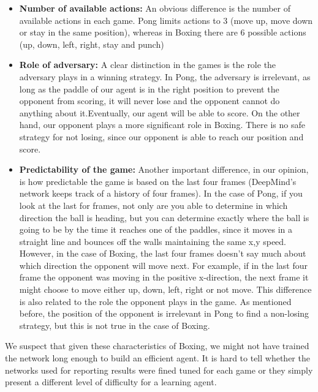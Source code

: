 \documentclass[a4paper]{article}
\begin{document}
\begin{itemize}
\item \textbf{Number of available actions:} An obvious difference is the number of available actions in each game. Pong limits actions to 3 (move up, move down or stay in the same position), whereas in Boxing there are 6 possible actions (up, down, left, right, stay and punch)

\item \textbf{Role of adversary:} A clear distinction in the games is the role the adversary plays in a winning strategy. In Pong, the adversary is irrelevant, as long as the paddle of our agent is in the right position to prevent the opponent from scoring, it will never lose and the opponent cannot do anything about it.Eventually, our agent will be able to score. On the other hand, our opponent plays a more significant role in Boxing. There is no safe strategy for not losing, since our opponent is able to reach our position and score.  

\item \textbf{Predictability of the game:} Another important difference, in our opinion, is how predictable the game is based on the last four frames (DeepMind's network keeps track of a history of four frames). In the case of Pong, if you look at the last for frames, not only are you able to determine in which direction the ball is heading, but you can determine exactly where the ball is going to be by the time it reaches one of the paddles, since it moves in a straight line and bounces off the walls maintaining the same x,y speed. However, in the case of Boxing, the last four frames doesn't say much about which direction the opponent will move next. For example, if in the last four frame the opponent was moving in the positive x-direction, the next frame it might choose to move either up, down, left, right or not move. This difference is also related to the role the opponent plays in the game. As mentioned before, the position of the opponent is irrelevant in Pong to find a non-losing strategy, but this is not true in the case of Boxing.

\end{itemize} 

 
 We suspect that given these characteristics of Boxing, we might not have trained the network long enough to build an efficient agent. It is hard to tell whether the networks used for reporting results were fined tuned for each game or they simply present a different level of difficulty for a learning agent. 
 
\end{document}
